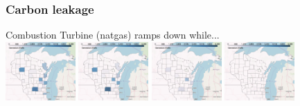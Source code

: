 \documentclass[xcolor=dvipsnames]{beamer}
\begin{document}
\begin{frame}
  \frametitle{Carbon leakage}


  \item Combustion Turbine (natgas) ramps down while... \\
  \includegraphics[width=0.2\textwidth]{includes/no_leakage_shutdowns_CT_r0.png}
  \includegraphics[width=0.2\textwidth]{includes/no_leakage_shutdowns_CT_r2.png}
  \includegraphics[width=0.2\textwidth]{includes/no_leakage_shutdowns_CT_r3.png}
  \includegraphics[width=0.2\textwidth]{includes/no_leakage_shutdowns_CT_r4.png}




\end{frame}
\end{document}
